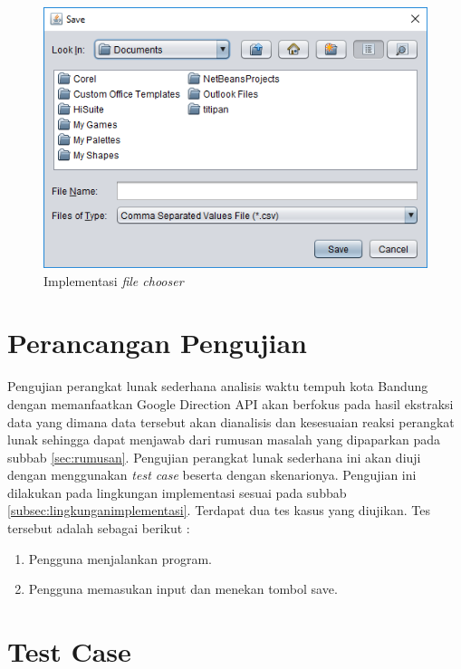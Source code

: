 \begin{figure}[H]
				\centering		
				\includegraphics[scale=0.7]{Gambar/gui2.png}
				\caption[Implementasi \textit{file chooser}]{Implementasi \textit{file chooser}}
				\label{fig:implementasifilechooser}	
			\end{figure}
			
\section{Perancangan Pengujian}
\label{sec:perancanganpengujian}

Pengujian perangkat lunak sederhana analisis waktu tempuh kota Bandung dengan memanfaatkan Google Direction API akan berfokus pada hasil ekstraksi data yang dimana data tersebut akan dianalisis dan kesesuaian reaksi perangkat lunak sehingga dapat menjawab dari rumusan masalah yang dipaparkan pada subbab \ref{sec:rumusan}. Pengujian perangkat lunak sederhana ini akan diuji dengan menggunakan \textit{test case} beserta dengan skenarionya. Pengujian ini dilakukan pada lingkungan implementasi sesuai pada subbab \ref{subsec:lingkunganimplementasi}. Terdapat dua tes kasus yang diujikan. Tes tersebut adalah sebagai berikut :
\begin{enumerate}
	\item Pengguna menjalankan program.
	\item Pengguna memasukan input dan menekan tombol save.
\end{enumerate}

\section{Test Case}
\label{sec:testcase}

